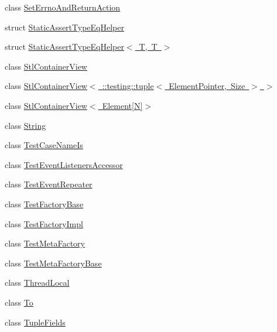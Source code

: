 \begin{DoxyCompactItemize}
\item 
class \mbox{\hyperlink{classtesting_1_1internal_1_1SetErrnoAndReturnAction}{Set\+Errno\+And\+Return\+Action}}
\item 
struct \mbox{\hyperlink{structtesting_1_1internal_1_1StaticAssertTypeEqHelper}{Static\+Assert\+Type\+Eq\+Helper}}
\item 
struct \mbox{\hyperlink{structtesting_1_1internal_1_1StaticAssertTypeEqHelper_3_01T_00_01T_01_4}{Static\+Assert\+Type\+Eq\+Helper$<$ T, T $>$}}
\item 
class \mbox{\hyperlink{classtesting_1_1internal_1_1StlContainerView}{Stl\+Container\+View}}
\item 
class \mbox{\hyperlink{classtesting_1_1internal_1_1StlContainerView_3_01_1_1testing_1_1tuple_3_01ElementPointer_00_01Size_01_4_01_4}{Stl\+Container\+View$<$ \+::testing\+::tuple$<$ Element\+Pointer, Size $>$ $>$}}
\item 
class \mbox{\hyperlink{classtesting_1_1internal_1_1StlContainerView_3_01Element[N]_4}{Stl\+Container\+View$<$ Element\mbox{[}\+N\mbox{]}$>$}}
\item 
class \mbox{\hyperlink{classtesting_1_1internal_1_1String}{String}}
\item 
class \mbox{\hyperlink{classtesting_1_1internal_1_1TestCaseNameIs}{Test\+Case\+Name\+Is}}
\item 
class \mbox{\hyperlink{classtesting_1_1internal_1_1TestEventListenersAccessor}{Test\+Event\+Listeners\+Accessor}}
\item 
class \mbox{\hyperlink{classtesting_1_1internal_1_1TestEventRepeater}{Test\+Event\+Repeater}}
\item 
class \mbox{\hyperlink{classtesting_1_1internal_1_1TestFactoryBase}{Test\+Factory\+Base}}
\item 
class \mbox{\hyperlink{classtesting_1_1internal_1_1TestFactoryImpl}{Test\+Factory\+Impl}}
\item 
class \mbox{\hyperlink{classtesting_1_1internal_1_1TestMetaFactory}{Test\+Meta\+Factory}}
\item 
class \mbox{\hyperlink{classtesting_1_1internal_1_1TestMetaFactoryBase}{Test\+Meta\+Factory\+Base}}
\item 
class \mbox{\hyperlink{classtesting_1_1internal_1_1ThreadLocal}{Thread\+Local}}
\item 
class \mbox{\hyperlink{classtesting_1_1internal_1_1To}{To}}
\item 
class \mbox{\hyperlink{classtesting_1_1internal_1_1TupleFields}{Tuple\+Fields}}
\item 

\end{DoxyCompactItemize}
